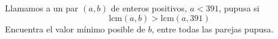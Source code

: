 Llamamos a un par $(a,b)$ de enteros positivos, $a\lt391$, pupusa si
\[\text{lcm}(a,b)\gt\text{lcm}(a,391) \]
Encuentra el valor mínimo posible de $b$, entre todas las parejas pupusa.
